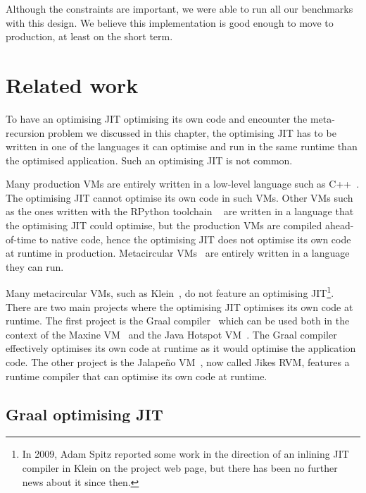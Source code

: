 \documentclass[a4paper,12pt,twoside]{../includes/ThesisStyle}
\begin{document}
Although the constraints are important, we were able to run all our benchmarks with this design. We believe this implementation is good enough to move to production, at least on the short term.


\section{Related work}
\label{sec:recRelW}

To have an optimising JIT optimising its own code and encounter the meta-recursion problem we discussed in this chapter, the optimising JIT has to be written in one of the languages it can optimise and run in the same runtime than the optimised application. Such an optimising JIT is not common.

Many production VMs are entirely written in a low-level language such as C++~\cite{V8,Webkit15}. The optimising JIT cannot optimise its own code in such VMs. Other VMs such as the ones written with the RPython toolchain ~\cite{Rigo06a} are written in a language that the optimising JIT could optimise, but the production VMs are compiled ahead-of-time to native code, hence the optimising JIT does not optimise its own code at runtime in production. Metacircular VMs~\cite{Unga05b,Alp99a} are entirely written in a language they can run. 

Many metacircular VMs, such as Klein~\cite{Unga05b}, do not feature an optimising JIT\footnote{In 2009, Adam Spitz reported some work in the direction of an inlining JIT compiler in Klein on the project web page, but there has been no further news about it since then.}. There are two main projects where the optimising JIT optimises its own code at runtime. The first project is the Graal compiler~\cite{Oracle13,Dubo13c} which can be used both in the context of the Maxine VM~\cite{Wimm13a} and the Java Hotspot VM~\cite{Pale01a}. The Graal compiler effectively optimises its own code at runtime as it would optimise the application code. The other project is the Jalape\~no VM~\cite{Alp99a}, now called Jikes RVM, features a runtime compiler that can optimise its own code at runtime. 

\subsection{Graal optimising JIT}
\end{document}

